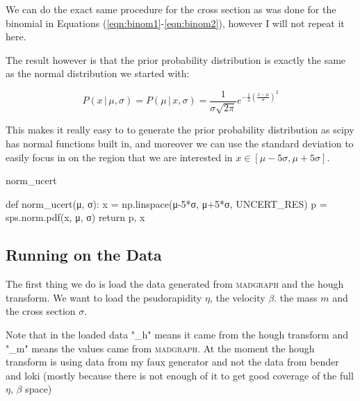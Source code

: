 \documentclass[10pt, a4paper]{article}
\begin{document}
We can do the exact same procedure for the cross section as was done for the binomial in Equations (\ref{eqn:binom1}-\ref{eqn:binom2}), however I will not repeat it here. 

The result however is that the prior probability distribution is exactly the same as the normal distribution we started with:

\begin{equation}
 P(x \,|\, \mu, \sigma) = P(\mu \,|\, x, \sigma) = \frac{1}{\sigma \sqrt{2\pi}} e^{-\frac{1}{2}\left( \frac{x-\mu}{\sigma} \right)^2}
\end{equation}

This makes it really easy to to generate the prior probability distribution as scipy has normal functions built in, and moreover we can use the standard deviation to easily focus in on the region that we are interested in $x\in [\mu-5\sigma, \mu+5\sigma]$.


\begin{codeblock}{norm_ucert}
\begin{code}
def norm_ucert(μ, σ):
	x = np.linspace(μ-5*σ, μ+5*σ, UNCERT_RES)
	p = sps.norm.pdf(x, μ, σ)
	return p, x
\end{code}
\end{codeblock}

\subsection{Running on the Data}

The first thing we do is load the data generated from \textsc{madgraph} and the hough transform. We want to load the psudorapidity $\eta$, the velocity $\beta$. the mass $m$ and the cross section $\sigma$.

Note that in the loaded data "_h" means it came from the hough transform and "_m" means the values came from \textsc{madgraph}. 
At the moment the hough transform is using data from my faux generator and not the data from bender and loki (mostly because there is not enough of it to get good coverage of the full $\eta$, $\beta$ space)
\end{document}
